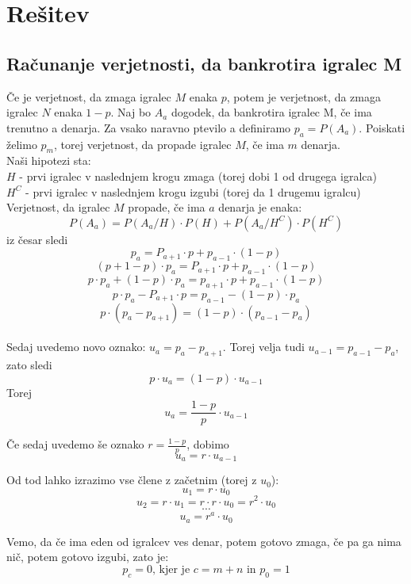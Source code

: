 \documentclass[12pt, a4paper]{article}
\begin{document}
\newpage

\section[Rešitev]{Rešitev}
\subsection{Računanje verjetnosti, da bankrotira igralec M}

Če je verjetnost, da zmaga igralec $M$ enaka $p$, potem je verjetnost, da zmaga igralec $N$ enaka $1-p$. Naj bo $A_a$ dogodek, da bankrotira igralec M, če ima trenutno a denarja. Za vsako naravno ptevilo a definiramo $p_a = P(A_a)$.
Poiskati želimo $p_m$, torej verjetnost, da propade igralec $M$, če ima $m$ denarja. 
\\

Naši hipotezi sta:
\\
$H$ - prvi igralec v naslednjem krogu zmaga (torej dobi 1 od drugega igralca)
\\
$H^C$ - prvi igralec v naslednjem krogu izgubi (torej da 1 drugemu igralcu)
\\

Verjetnost, da igralec $M$ propade, če ima $a$ denarja je enaka:
\\
$$P(A_a) = P(A_a / H) \cdot P(H) + P(A_a / H^C) \cdot P(H^C)$$ iz česar sledi
$$p_a = P_{a+1} \cdot p + p_{a-1} \cdot (1 - p) $$
$$(p + 1 -p) \cdot p_a = P_{a+1} \cdot p + p_{a-1} \cdot (1 - p) $$
$$ p \cdot p_a + (1 - p) \cdot p_a = p_{a+1} \cdot p + p_{a-1} \cdot (1 - p) $$
$$p \cdot p_a - P_{a+1} \cdot p = p_{a-1} - (1-p) \cdot p_a$$
$$p \cdot (p_a - p_{a+1}) = (1-p) \cdot (p_{a-1} - p_a)$$
\\

Sedaj uvedemo novo oznako: $u_a = p_a - p_{a+1}$. Torej velja tudi $u_{a-1} = p_{a-1} - p_a$, zato sledi
$$p \cdot u_a = (1 - p) \cdot u_{a-1}$$
Torej $$u_a = \frac{1-p}{p} \cdot u_{a-1}$$

Če sedaj uvedemo še oznako $r=\frac{1-p}{p}$, dobimo
$$u_a = r \cdot u_{a-1}$$

Od tod lahko izrazimo vse člene z začetnim (torej z $u_0$):
$$u_1 = r \cdot u_0$$
$$u_2 = r \cdot u_1 = r \cdot r \cdot u_0 = r^2 \cdot u_0$$ 
$$\cdots $$
$$u_a = r^a \cdot u_0$$
\newpage

Vemo, da če ima eden od igralcev ves denar, potem gotovo zmaga, če pa ga nima nič, potem gotovo izgubi, zato je:
$$p_c = 0 \textrm{, kjer je } c = m + n \textrm{ in } p_0 = 1$$
\end{document}
